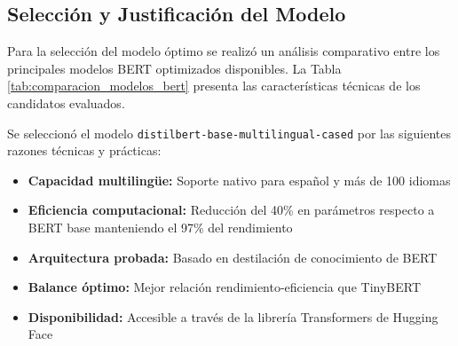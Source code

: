 \subsection{Selección y Justificación del Modelo}

Para la selección del modelo óptimo se realizó un análisis comparativo entre los principales modelos BERT optimizados disponibles. La Tabla \ref{tab:comparacion_modelos_bert} presenta las características técnicas de los candidatos evaluados.

\begin{table}[htbp]
\centering
{}
\caption{Comparación de modelos BERT optimizados para la tarea de clasificación.}
\label{tab:comparacion_modelos_bert}
\end{table}

Se seleccionó el modelo \texttt{distilbert-base-multilingual-cased} por las siguientes razones técnicas y prácticas:

\begin{itemize}
    \item \textbf{Capacidad multilingüe:} Soporte nativo para español y más de 100 idiomas
    \item \textbf{Eficiencia computacional:} Reducción del 40\% en parámetros respecto a BERT base manteniendo el 97\% del rendimiento \cite{sanh2019distilbert}
    \item \textbf{Arquitectura probada:} Basado en destilación de conocimiento de BERT \cite{devlin2018bert}
    \item \textbf{Balance óptimo:} Mejor relación rendimiento-eficiencia que TinyBERT \cite{jiao2019tinybert}
    \item \textbf{Disponibilidad:} Accesible a través de la librería Transformers de Hugging Face
\end{itemize}

